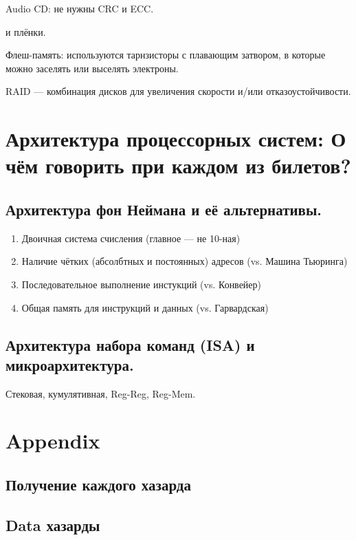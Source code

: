 \documentclass[12pt, a4paper]{article}
\begin{document}
Audio CD: не нужны CRC и ECC.




и плёнки.

Флеш-память: используются тарнзисторы с плавающим затвором, в которые можно заселять или выселять электроны.

RAID — комбинация дисков для увеличения скорости и/или отказоустойчивости.


\section{Архитектура процессорных систем: О чём говорить при каждом из билетов?}

\subsection{Архитектура фон Неймана и её альтернативы.}

\begin{enumerate}
    \item Двоичная система счисления (главное — не 10-ная)
    \item Наличие чётких (абсолбтных и постоянных) адресов (vs. Машина Тьюринга)
    \item Последовательное выполнение инстукций (vs. Конвейер)
    \item Общая память для инструкций и данных (vs. Гарвардская)
\end{enumerate}



\subsection{Архитектура набора команд (ISA) и микроархитектура.}

Стековая, кумулятивная, Reg-Reg, Reg-Mem.




\section{Appendix}

\subsection{Получение каждого хазарда}

\subsection{Data хазарды}
\end{document}
